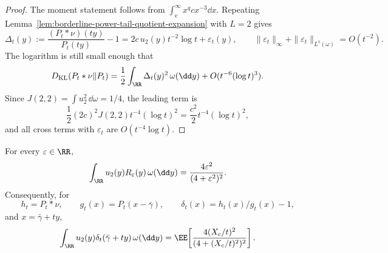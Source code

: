 \begin{proof}
The moment statement follows from
\(\int_{\mathrm e}^{\infty}x^qc x^{-3}\dd x\).  Repeating
Lemma~\ref{lem:borderline-power-tail-quotient-expansion} with \(L=2\) gives
\[
\Delta_t(y):=\frac{(P_t*\nu)(ty)}{P_t(ty)}-1
=2c\,u_2(y)t^{-2}\log t+\varepsilon_t(y),
\qquad
\|\varepsilon_t\|_\infty+\|\varepsilon_t\|_{L^1(\omega)}=O(t^{-2}).
\]
The logarithm is still small enough that
\[
D_{\mathrm{KL}}(P_t*\nu\|P_t)
=\frac12\int_{\RR}\Delta_t(y)^2\,\omega(\dd y)+O(t^{-6}(\log t)^3).
\]
Since \(J(2,2)=\int u_2^2\,\dd\omega=1/4\), the leading term is
\[
\frac12(2c)^2J(2,2)t^{-4}(\log t)^2
=\frac{c^2}{2}t^{-4}(\log t)^2,
\]
and all cross terms with \(\varepsilon_t\) are \(O(t^{-4}\log t)\).
\end{proof}

\begin{lemma}%
\label{lem:second-mode-cauchy-translate-transform}
For every \(\varepsilon\in\RR\),
\begin{equation}\label{eq:second-mode-cauchy-translate-transform}
\int_{\RR}u_2(y)R_\varepsilon(y)\,\omega(\dd y)
=\frac{4\varepsilon^2}{(4+\varepsilon^2)^2}.
\end{equation}
Consequently, for
\[
h_t=P_t*\nu,\qquad g_t(x)=P_t(x-\bar{\gamma}),\qquad
\delta_t(x)=h_t(x)/g_t(x)-1,
\]
and \(x=\bar{\gamma}+ty\),
\begin{equation}\label{eq:second-mode-projection-exact}
\int_{\RR}u_2(y)\delta_t(\bar{\gamma}+ty)\,\omega(\dd y)
=
\EE\!\left[\frac{4(X_c/t)^2}{(4+(X_c/t)^2)^2}\right].
\end{equation}
\end{lemma}

